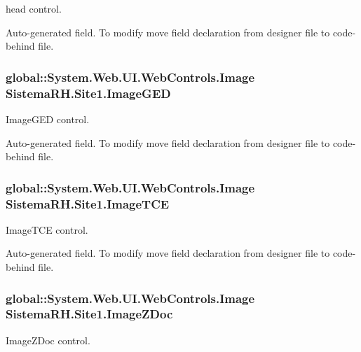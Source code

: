 head control. 

Auto-\/generated field. To modify move field declaration from designer file to code-\/behind file. \hypertarget{class_sistema_r_h_1_1_site1_aa109f82fe67ae9f8c83281567a483b27}{
\subsubsection[{ImageGED}]{\setlength{\rightskip}{0pt plus 5cm}global::System.Web.UI.WebControls.Image {\bf SistemaRH.Site1.ImageGED}}}
\label{class_sistema_r_h_1_1_site1_aa109f82fe67ae9f8c83281567a483b27}


ImageGED control. 

Auto-\/generated field. To modify move field declaration from designer file to code-\/behind file. \hypertarget{class_sistema_r_h_1_1_site1_a463eb7707d2ce6285c3719aabb2782bd}{
\subsubsection[{ImageTCE}]{\setlength{\rightskip}{0pt plus 5cm}global::System.Web.UI.WebControls.Image {\bf SistemaRH.Site1.ImageTCE}}}
\label{class_sistema_r_h_1_1_site1_a463eb7707d2ce6285c3719aabb2782bd}


ImageTCE control. 

Auto-\/generated field. To modify move field declaration from designer file to code-\/behind file. \hypertarget{class_sistema_r_h_1_1_site1_a0c5887172f99f2f9193929c205b52b30}{
\subsubsection[{ImageZDoc}]{\setlength{\rightskip}{0pt plus 5cm}global::System.Web.UI.WebControls.Image {\bf SistemaRH.Site1.ImageZDoc}}}
\label{class_sistema_r_h_1_1_site1_a0c5887172f99f2f9193929c205b52b30}


ImageZDoc control. 

